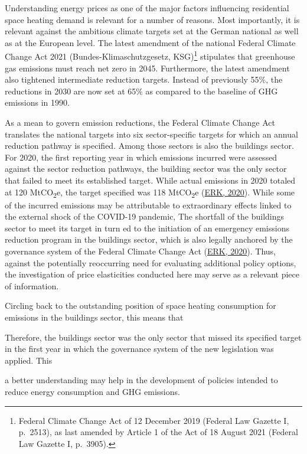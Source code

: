 \documentclass[12pt,twoside]{reedthesis}
\begin{document}
Understanding energy prices as one of the major factors influencing residential space heating demand is relevant for a number of reasons. Most importantly, it is relevant against the ambitious climate targets set at the German national as well as at the European level. The latest amendment of the national Federal Climate Change Act 2021 (Bundes-Klimaschutzgesetz, KSG)\footnote{Federal Climate Change Act of 12 December 2019 (Federal Law Gazette I, p.~2513), as last amended by Article 1 of the Act of 18 August 2021 (Federal Law Gazette I, p.~3905).} stipulates that greenhouse gas emissions must reach net zero in 2045. Furthermore, the latest amendment also tightened intermediate reduction targets. Instead of previously 55\%, the reductions in 2030 are now set at 65\% as compared to the baseline of GHG emissions in 1990.

As a mean to govern emission reductions, the Federal Climate Change Act translates the national targets into six sector-specific targets for which an annual reduction pathway is specified. Among those sectors is also the buildings sector. For 2020, the first reporting year in which emissions incurred were assessed against the sector reduction pathways, the building sector was the only sector that failed to meet its established target. While actual emissions in 2020 totaled at 120 MtCO\textsubscript{2}e, the target specified was 118 MtCO\textsubscript{2}e (\protect\hyperlink{ref-erk20}{ERK, 2020}). While some of the incurred emissions may be attributable to extraordinary effects linked to the external shock of the COVID-19 pandemic, The shortfall of the buildings sector to meet its target in turn ed to the initiation of an emergency emissions reduction program in the buildings sector, which is also legally anchored by the governance system of the Federal Climate Change Act (\protect\hyperlink{ref-erk20}{ERK, 2020}). Thus, against the potentially reoccurring need for evaluating additional policy options, the investigation of price elasticities conducted here may serve as a relevant piece of information.

Circling back to the outstanding position of space heating consumption for emissions in the buildings sector, this means that

Therefore, the buildings sector was the only sector that missed its specified target in the first year in which the governance system of the new legislation was applied. This

a better understanding may help in the development of policies intended to reduce energy consumption and GHG emissions.
\end{document}
